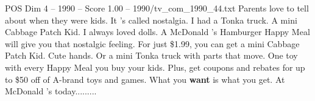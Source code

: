 \begin{textsample}{POS Dim 4 – 1990 – Score 1.00 – 1990/tv\_com\_1990\_44.txt}  \label{ex:f4_pos_025}
Parents love to tell about when they were kids.
It 's called nostalgia.
I had a Tonka truck.
A mini Cabbage Patch Kid.
I always loved dolls.
A McDonald 's Hamburger Happy Meal will give you that nostalgic feeling.
For just \$1.99, you can get a mini Cabbage Patch Kid.
Cute hands.
Or a mini Tonka truck with parts that move.
One toy with every Happy Meal you buy your kids.
Plus, get coupons and rebates for up to \$50 off of A-brand toys and games.
What you \textbf{want} is what you get.
At McDonald 's today.........

\end{textsample}
